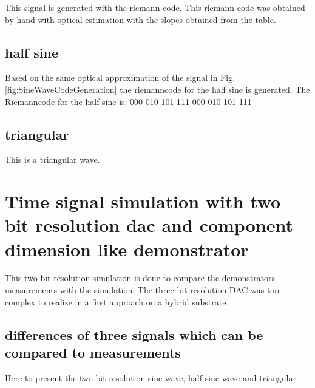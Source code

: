 This signal is generated with the riemann code. This riemann code was obtained by hand with optical estimation with the slopes obtained from the table.
\subsection{half sine}
Based on the same optical approximation of the signal in Fig. \ref{fig:SineWaveCodeGeneration} the riemanncode for the half sine is generated. The Riemanncode for the half sine is: 000 010 101 111 000 010 101 111
\subsection{triangular}
This is a triangular wave.
%


\section{Time signal simulation with two bit resolution dac and component dimension like demonstrator}
This two bit resolution simulation is done to compare the demonstrators measurements with the simulation. The three bit resolution DAC was too complex to realize in a first approach on a hybrid substrate
\subsection{differences of three signals which can be compared to measurements}
Here to present the two bit resolution sine wave, half sine wave and triangular

